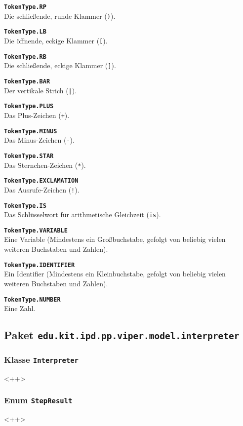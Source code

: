 \documentclass[parskip=full,11pt,twoside]{scrartcl}
\begin{document}
\textbf{\texttt{TokenType.RP}}\\
Die schließende, runde Klammer (\texttt{)}).

\textbf{\texttt{TokenType.LB}}\\
Die öffnende, eckige Klammer (\texttt{[}).

\textbf{\texttt{TokenType.RB}}\\
Die schließende, eckige Klammer (\texttt{]}).

\textbf{\texttt{TokenType.BAR}}\\
Der vertikale Strich (\texttt{|}).

\textbf{\texttt{TokenType.PLUS}}\\
Das Plus-Zeichen (\texttt{+}).

\textbf{\texttt{TokenType.MINUS}}\\
Das Minus-Zeichen (\texttt{-}).

\textbf{\texttt{TokenType.STAR}}\\
Das Sternchen-Zeichen (\texttt{*}).

\textbf{\texttt{TokenType.EXCLAMATION}}\\
Das Ausrufe-Zeichen (\texttt{!}).

\textbf{\texttt{TokenType.IS}}\\
Das Schlüsselwort für arithmetische Gleichzeit (\texttt{is}).

\textbf{\texttt{TokenType.VARIABLE}}\\
Eine Variable (Mindestens ein Großbuchstabe, gefolgt von beliebig vielen weiteren Buchstaben und Zahlen).

\textbf{\texttt{TokenType.IDENTIFIER}}\\
Ein Identifier (Mindestens ein Kleinbuchstabe, gefolgt von beliebig vielen weiteren Buchstaben und Zahlen).

\textbf{\texttt{TokenType.NUMBER}}\\
Eine Zahl.

\newpage
\subsection{Paket \texttt{edu.kit.ipd.pp.viper.model.interpreter}}

\subsubsection{Klasse \texttt{Interpreter}}
<++>

\subsubsection{Enum \texttt{StepResult}}
<++>
\end{document}
